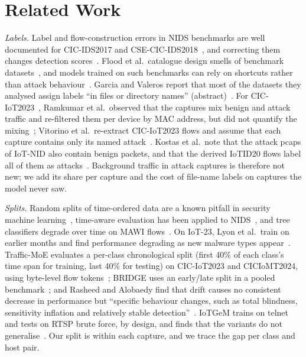 \section{Related Work}\label{sec:related}

\emph{Labels.} Label and flow-construction errors in NIDS benchmarks are well documented for CIC-IDS2017 and CSE-CIC-IDS2018~\cite{engelen2021troubleshooting,liu2022error}, and correcting them changes detection scores~\cite{lanvin2023errors}. Flood et al.\ catalogue design smells of benchmark datasets~\cite{flood2024smells}, and models trained on such benchmarks can rely on shortcuts rather than attack behaviour~\cite{jacobs2022emperor}. Garcia and Valeros report that most of the datasets they analysed assign labels ``in files or directory names'' (abstract)~\cite{garcia2023labeling}. For CIC-IoT2023~\cite{neto2023ciciot2023}, Ramkumar et al.\ observed that the captures mix benign and attack traffic and re-filtered them per device by MAC address, but did not quantify the mixing~\cite{ramkumar2024diagnosing}; Vitorino et al.\ re-extract CIC-IoT2023 flows and assume that each capture contains only its named attack~\cite{vitorino2025revisiting}. Kostas et al.\ note that the attack pcaps of IoT-NID also contain benign packets, and that the derived IoTID20 flows label all of them as attacks~\cite[App.~A.3]{kostas2024iotgem}. Background traffic in attack captures is therefore not new; we add its share per capture and the cost of file-name labels on captures the model never saw.

\emph{Splits.} Random splits of time-ordered data are a known pitfall in security machine learning~\cite{arp2022dos,pendlebury2019tesseract,apruzzese2023sok}, time-aware evaluation has been applied to NIDS~\cite{andresini2021insomnia}, and tree classifiers degrade over time on MAWI flows~\cite{schraven2026mawiflow}. On IoT-23, Lyon et al.\ train on earlier months and find performance degrading as new malware types appear~\cite{lyon2026iot23drift}. Traffic-MoE evaluates a per-class chronological split (first 40\% of each class's time span for training, last 40\% for testing) on CIC-IoT2023 and CICIoMT2024, using byte-level flow tokens~\cite{zhou2026trafficmoe}; BRIDGE uses an early/late split in a pooled benchmark~\cite{bridge2026tchnet}; and Rasheed and Alobaedy find that drift causes no consistent decrease in performance but ``specific behaviour changes, such as total blindness, sensitivity inflation and relatively stable detection''~\cite{rasheed2026drift}. IoTGeM trains on telnet and tests on RTSP brute force, by design, and finds that the variants do not generalise~\cite{kostas2024iotgem}. Our split is within each capture, and we trace the gap per class and host pair.

